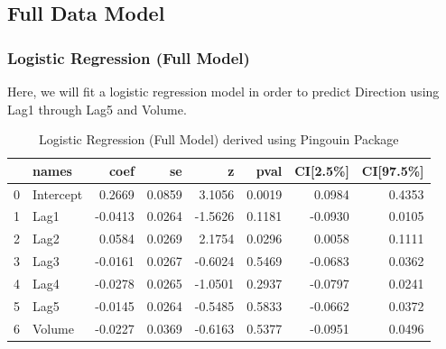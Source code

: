 \documentclass[12pt]{article}
\begin{document}
\begin{table}[h!]
\caption{Pearson Correlation between Volume and Year}
\label{table_4}
\end{table}

\subsection{Full Data Model}
\subsubsection{Logistic Regression (Full Model)}
Here, we will fit a logistic regression model in order to predict Direction using Lag1 through Lag5 and Volume.

\begin{table}[h!]
\centering
\begin{tabular}{llrrrrrr}
\hline
{} &      names &    coef &      se &       z &    pval &  CI[2.5\%] &  CI[97.5\%] \\
\hline
0 &  Intercept &  0.2669 &  0.0859 &  3.1056 &  0.0019 &    0.0984 &     0.4353 \\
1 &       Lag1 & -0.0413 &  0.0264 & -1.5626 &  0.1181 &   -0.0930 &     0.0105 \\
2 &       Lag2 &  0.0584 &  0.0269 &  2.1754 &  0.0296 &    0.0058 &     0.1111 \\
3 &       Lag3 & -0.0161 &  0.0267 & -0.6024 &  0.5469 &   -0.0683 &     0.0362 \\
4 &       Lag4 & -0.0278 &  0.0265 & -1.0501 &  0.2937 &   -0.0797 &     0.0241 \\
5 &       Lag5 & -0.0145 &  0.0264 & -0.5485 &  0.5833 &   -0.0662 &     0.0372 \\
6 &     Volume & -0.0227 &  0.0369 & -0.6163 &  0.5377 &   -0.0951 &     0.0496 \\
\hline
\end{tabular}
\caption{Logistic Regression (Full Model) derived using Pingouin Package}
\label{table_5}
\end{table}
\end{document}
